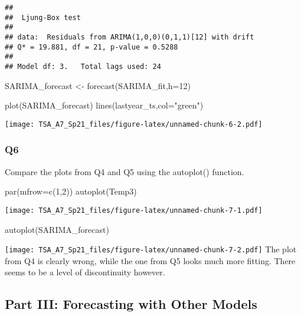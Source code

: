 \documentclass[
]{article}
\newenvironment{Shaded}{\begin{snugshade}}{\end{snugshade}}
\newcommand{\AttributeTok}[1]{\textcolor[rgb]{0.77,0.63,0.00}{#1}}
\newcommand{\DecValTok}[1]{\textcolor[rgb]{0.00,0.00,0.81}{#1}}
\newcommand{\FunctionTok}[1]{\textcolor[rgb]{0.00,0.00,0.00}{#1}}
\newcommand{\NormalTok}[1]{#1}
\newcommand{\OtherTok}[1]{\textcolor[rgb]{0.56,0.35,0.01}{#1}}
\newcommand{\StringTok}[1]{\textcolor[rgb]{0.31,0.60,0.02}{#1}}
\begin{document}
\begin{verbatim}
## 
##  Ljung-Box test
## 
## data:  Residuals from ARIMA(1,0,0)(0,1,1)[12] with drift
## Q* = 19.881, df = 21, p-value = 0.5288
## 
## Model df: 3.   Total lags used: 24
\end{verbatim}

\begin{Shaded}
\begin{Highlighting}[]
\NormalTok{SARIMA\_forecast }\OtherTok{\textless{}{-}} \FunctionTok{forecast}\NormalTok{(SARIMA\_fit,}\AttributeTok{h=}\DecValTok{12}\NormalTok{)}

\FunctionTok{plot}\NormalTok{(SARIMA\_forecast)}
\FunctionTok{lines}\NormalTok{(lastyear\_ts,}\AttributeTok{col=}\StringTok{"green"}\NormalTok{)}
\end{Highlighting}
\end{Shaded}

\texttt{[image: TSA\_A7\_Sp21\_files/figure-latex/unnamed-chunk-6-2.pdf]}

\hypertarget{q6}{%
\subsubsection{Q6}\label{q6}}

Compare the plots from Q4 and Q5 using the autoplot() function.

\begin{Shaded}
\begin{Highlighting}[]
\FunctionTok{par}\NormalTok{(}\AttributeTok{mfrow=}\FunctionTok{c}\NormalTok{(}\DecValTok{1}\NormalTok{,}\DecValTok{2}\NormalTok{))}
\FunctionTok{autoplot}\NormalTok{(Temp3)}
\end{Highlighting}
\end{Shaded}

\texttt{[image: TSA\_A7\_Sp21\_files/figure-latex/unnamed-chunk-7-1.pdf]}

\begin{Shaded}
\begin{Highlighting}[]
\FunctionTok{autoplot}\NormalTok{(SARIMA\_forecast)}
\end{Highlighting}
\end{Shaded}

\texttt{[image: TSA\_A7\_Sp21\_files/figure-latex/unnamed-chunk-7-2.pdf]}
The plot from Q4 is clearly wrong, while the one from Q5 looks much more
fitting. There seems to be a level of discontinuity however.

\hypertarget{part-iii-forecasting-with-other-models}{%
\subsection{Part III: Forecasting with Other
Models}\label{part-iii-forecasting-with-other-models}}
\end{document}
